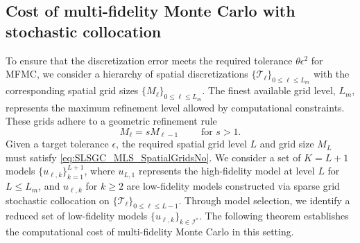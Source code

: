 \subsection{Cost of multi-fidelity Monte Carlo with stochastic collocation}
\label{sec:Cost_MFMC_with_SC}
To ensure that the discretization error meets the required tolerance $\theta \epsilon^2$ for MFMC, we consider a hierarchy of spatial discretizations $\{\mathcal{T}_\ell\}_{0\le \ell \le L_{m}}$ with the corresponding spatial grid sizes $\{M_\ell\}_{0\le \ell \le L_{m}}$. The finest available grid level, $L_m$, represents the maximum refinement level allowed by computational constraints. These grids adhere to a geometric refinement rule
%
\begin{equation}
\label{eq:MeshGrowth}
M_\ell = s M_{\ell-1} \qquad \text{ for } s>1.
\end{equation}
%
Given a target tolerance $\epsilon$, the required spatial grid level $L$ and grid size $M_L$ must satisfy \eqref{eq:SLSGC_MLS_SpatialGridsNo}. We consider a set of $K=L+1$ models $\{u_{\ell,k}\}_{k=1}^{L+1}$, where $u_{L,1}$ represents the high-fidelity model at level $L$ for $L\le L_{m}$, and $u_{\ell,k}$ for $k \geq 2$ are low-fidelity models constructed via sparse grid stochastic collocation on $\{\mathcal{T}_\ell\}_{0\le \ell \le L-1}$. Through model selection, we identify a reduced set of low-fidelity models $\{u_{\ell,k}\}_{k\in \mathcal{I}^*}$.  The following theorem establishes the computational cost of multi-fidelity Monte Carlo in this setting.





